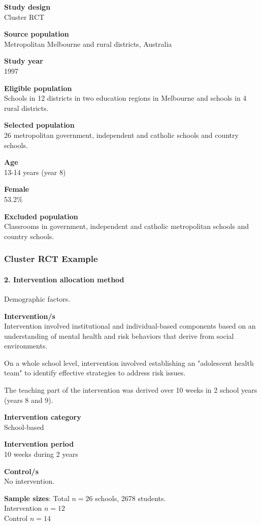 \documentclass[table,10pt]{beamer}
\begin{document}
\begin{CJK*}{UTF8}{gbsn}
\begin{frame}[t]
\textbf{Study design}\\
Cluster RCT

\textbf{Source population}\\
Metropolitan Melbourne and rural districts, Australia

\textbf{Study year}\\
1997

\textbf{Eligible population}\\
Schools in 12 districts in two education regions in Melbourne and schools 
in 4 rural districts.

\textbf{Selected population}\\
26 metropolitan government, independent and catholic schools and country 
schools.

\textbf{Age}\\
13-14 years (year 8)

\textbf{Female}\\
53.2\%

\textbf{Excluded population}\\
Classrooms in government, independent and catholic metropolitan schools 
and country schools. 
\end{frame}


\begin{frame}[t]
\frametitle{Cluster RCT Example}
\framesubtitle{2. Intervention allocation method}
\footnotesize
Demographic factors.

\textbf{Intervention/s}\\
Intervention involved institutional and individual-based components based 
on an understanding of mental health and risk behaviors that derive from 
social environments.

On a whole school level, intervention involved establishing an 
"adolescent health team" to identify effective strategies to address risk 
issues.

The teaching part of the intervention was derived over 10 weeks in 2 
school years (years 8 and 9).

\textbf{Intervention category}\\
School-based

\textbf{Intervention period}\\
10 weeks during 2 years

\textbf{Control/s}\\
No intervention.

\textbf{Sample sizes}:
Total $n = 26$ schools, 2678 students.\\
Intervention $n = 12$\\
Control $n=14$


\end{frame}
\end{CJK*}
\end{document}
